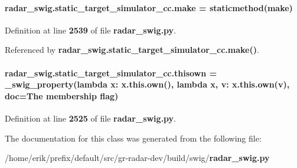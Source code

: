 \paragraph[{make}]{\setlength{\rightskip}{0pt plus 5cm}radar\+\_\+swig.\+static\+\_\+target\+\_\+simulator\+\_\+cc.\+make = staticmethod(make)\hspace{0.3cm}{\ttfamily [static]}}\label{classradar__swig_1_1static__target__simulator__cc_a256bf9f91ba87cbb120e1c9ec0179ed2}


Definition at line {\bf 2539} of file {\bf radar\+\_\+swig.\+py}.



Referenced by {\bf radar\+\_\+swig.\+static\+\_\+target\+\_\+simulator\+\_\+cc.\+make()}.

\paragraph[{thisown}]{\setlength{\rightskip}{0pt plus 5cm}radar\+\_\+swig.\+static\+\_\+target\+\_\+simulator\+\_\+cc.\+thisown = {\bf \+\_\+swig\+\_\+property}(lambda x\+: x.\+this.\+own(), lambda {\bf x}, v\+: x.\+this.\+own(v), doc=\textquotesingle{}The membership flag\textquotesingle{})\hspace{0.3cm}{\ttfamily [static]}}\label{classradar__swig_1_1static__target__simulator__cc_a4799897952e08806fc6546334e9c084a}


Definition at line {\bf 2525} of file {\bf radar\+\_\+swig.\+py}.



The documentation for this class was generated from the following file\+:\begin{DoxyCompactItemize}
\item 
/home/erik/prefix/default/src/gr-\/radar-\/dev/build/swig/{\bf radar\+\_\+swig.\+py}\end{DoxyCompactItemize}

